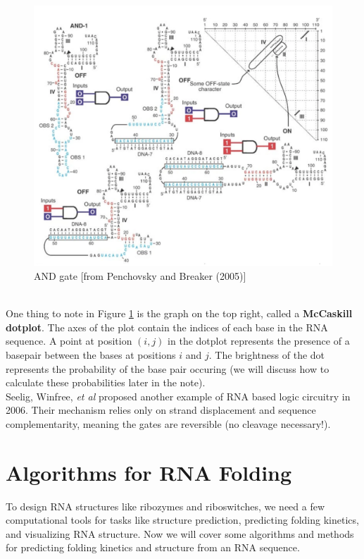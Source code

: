 \documentclass[12pt]{article}
\begin{document}
\begin{figure}[ht]
    \centering
    \includegraphics[width =.8\linewidth]{andgate.png}
    \caption{AND gate [from Penchovsky and Breaker (2005)]}
    \label{fig:and_gate}
\end{figure}\\
One thing to note in Figure \ref{fig:and_gate} is the graph on the top right, called a {\bf McCaskill dotplot}. The axes of the plot contain the indices of each base in the RNA sequence. A point at position $(i, j)$ in the dotplot represents the presence of a basepair between the bases at positions $i$ and $j$. The brightness of the dot represents the probability of the base pair occuring (we will discuss how to calculate these probabilities later in the note).\\[10pt]
Seelig, Winfree, {\it et al} proposed another example of RNA based logic circuitry in 2006. Their mechanism relies only on strand displacement and sequence complementarity, meaning the gates are reversible (no cleavage necessary!). 
\section{Algorithms for RNA Folding}
To design RNA structures like ribozymes and riboswitches, we need a few computational tools for tasks like structure prediction, predicting folding kinetics, and visualizing RNA structure. Now we will cover some algorithms and methods for predicting folding kinetics and structure from an RNA sequence.
\end{document}
